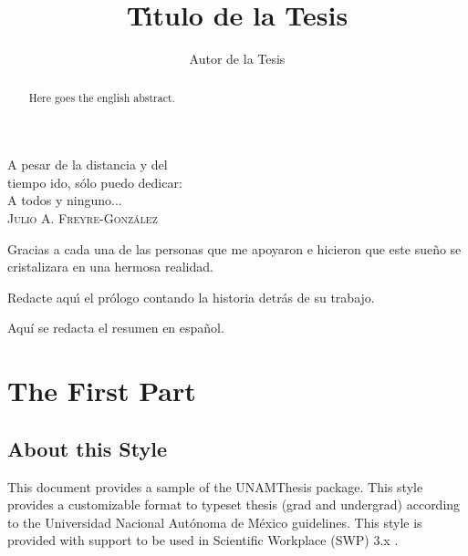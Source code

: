 \documentclass[11pt,spanish]{report}
\begin{document}
\title{T\'{\i}tulo de la Tesis}
\author{Autor de la Tesis}
\city{}
\degreemonth{}
\thispagestyle{empty}
\maketitle

\begin{dedication}
A pesar de la distancia y del\\
tiempo ido, s\'{o}lo puedo dedicar:\\
A todos y ninguno...\\
\textsc{Julio A. Freyre-Gonz\'{a}lez}
\end{dedication}

\begin{acknowledgements}
Gracias a cada una de las personas que me apoyaron e hicieron que
este sue\~{n}o se cristalizara en una hermosa realidad.
\end{acknowledgements}

\tableofcontents
\clearpage

\begin{foreword}
Redacte aqu\'{\i} el pr\'{o}logo contando la historia detr\'{a}s de su
trabajo.
\end{foreword}

\begin{resumen}
Aquí se redacta el resumen en español.
\end{resumen}

\begin{abstract}
Here goes the english abstract.
\end{abstract}


\part{The First Part}

\chapter{About this Style}

This document provides a sample of the UNAMThesis package. This style provides a
customizable format to typeset thesis (grad and undergrad) according to the Universidad
Nacional Aut\'{o}noma de M\'{e}xico guidelines. This style is provided with support to be
used in Scientific Workplace (SWP) 3.x \citep{Barabasi2002,Freyre-Gonzalez2008,
Freyre-Gonzalez2005}.
\end{document}
